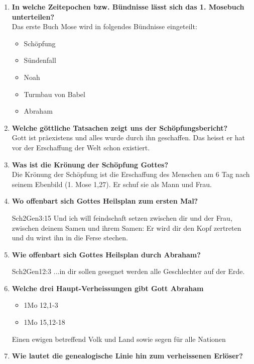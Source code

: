 
\begin{enumerate}
    \item \textbf{In welche Zeitepochen bzw. Bündnisse
    lässt sich das 1. Mosebuch unterteilen?}\\
    Das erste Buch Mose wird in folgendes Bündnisse eingeteilt:
    \begin{itemize}
        \item Schöpfung
        \item Sündenfall
        \item Noah
        \item Turmbau von Babel
        \item Abraham
    \end{itemize}
    \item \textbf{Welche göttliche Tatsachen zeigt uns der Schöpfungsbericht?}\\
    Gott ist präexistens und alles wurde durch ihn geschaffen. Das heisst er hat vor der Erschaffung der Welt schon existiert.
    \item \textbf{Was ist die Krönung der Schöpfung Gottes?}\\
    Die Krönung der Schöpfung ist die Erschaffung des Menschen am 6 Tag nach seinem Ebenbild (1. Mose 1,27). Er schuf sie als Mann und Frau.
    \item \textbf{Wo offenbart sich Gottes Heilsplan zum ersten Mal?}
    \begin{bibeltext}{Sch2}{Gen}{3:15}
        Und ich will feindschaft setzen zwischen dir und der Frau, zwischen deinem Samen und ihrem Samen: Er wird dir den Kopf zertreten und du wirst ihn in die Ferse stechen.
    \end{bibeltext}
    \item \textbf{Wie offenbart sich Gottes Heilsplan durch Abraham?}
    \begin{bibeltext}{Sch2}{Gen}{12:3}
        ...in dir sollen gesegnet werden alle Geschlechter auf der Erde.
    \end{bibeltext}
    \item \textbf{Welche drei Haupt-Verheissungen gibt Gott Abraham }
        \begin{itemize}
            \item 1Mo 12,1-3
            \item 1Mo 15,12-18
        \end{itemize}
        Einen ewigen betreffend Volk und Land sowie segen für alle Nationen
    \item \textbf{Wie lautet die genealogische Linie hin zum verheissenen Erlöser?}

\end{enumerate}
